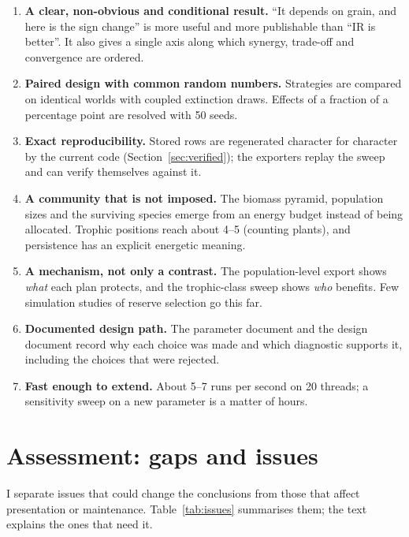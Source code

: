 \documentclass[11pt,a4paper]{article}
\begin{document}
\begin{enumerate}
\item \textbf{A clear, non-obvious and conditional result.} ``It depends on grain, and here is the sign
change'' is more useful and more publishable than ``IR is better''. It also gives a single axis along which
synergy, trade-off and convergence are ordered.
\item \textbf{Paired design with common random numbers.} Strategies are compared on identical worlds with
coupled extinction draws. Effects of a fraction of a percentage point are resolved with 50 seeds.
\item \textbf{Exact reproducibility.} Stored rows are regenerated character for character by the current
code (Section~\ref{sec:verified}); the exporters replay the sweep and can verify themselves against it.
\item \textbf{A community that is not imposed.} The biomass pyramid, population sizes and the surviving
species emerge from an energy budget instead of being allocated. Trophic positions reach about 4--5
(counting plants), and persistence has an explicit energetic meaning.
\item \textbf{A mechanism, not only a contrast.} The population-level export shows \emph{what} each plan
protects, and the trophic-class sweep shows \emph{who} benefits. Few simulation studies of reserve
selection go this far.
\item \textbf{Documented design path.} The parameter document and the design document record why each choice
was made and which diagnostic supports it, including the choices that were rejected.
\item \textbf{Fast enough to extend.} About 5--7 runs per second on 20 threads; a sensitivity sweep on a new
parameter is a matter of hours.
\end{enumerate}

\section{Assessment: gaps and issues}

I separate issues that could change the conclusions from those that affect presentation or maintenance.
Table~\ref{tab:issues} summarises them; the text explains the ones that need it.
\end{document}
